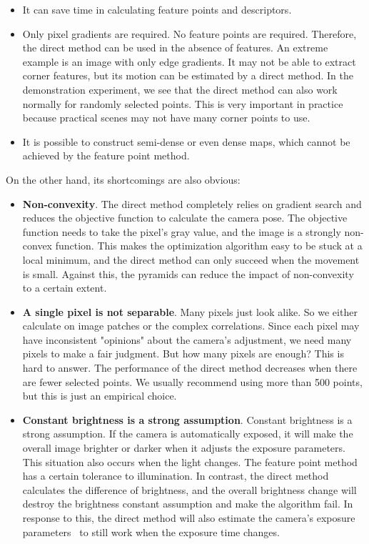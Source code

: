\begin{itemize}
	\item It can save time in calculating feature points and descriptors.
	\item Only pixel gradients are required. No feature points are required. Therefore, the direct method can be used in the absence of features. An extreme example is an image with only edge gradients. It may not be able to extract corner features, but its motion can be estimated by a direct method. In the demonstration experiment, we see that the direct method can also work normally for randomly selected points. This is very important in practice because practical scenes may not have many corner points to use.
	\item It is possible to construct semi-dense or even dense maps, which cannot be achieved by the feature point method.
\end{itemize}

On the other hand, its shortcomings are also obvious:
\begin{itemize}
	\item \textbf{Non-convexity}. The direct method completely relies on gradient search and reduces the objective function to calculate the camera pose. The objective function needs to take the pixel's gray value, and the image is a strongly non-convex function. This makes the optimization algorithm easy to be stuck at a local minimum, and the direct method can only succeed when the movement is small. Against this, the pyramids can reduce the impact of non-convexity to a certain extent.
	\item \textbf{A single pixel is not separable}. Many pixels just look alike. So we either calculate on image patches or the complex correlations. Since each pixel may have inconsistent "opinions" about the camera's adjustment, we need many pixels to make a fair judgment. But how many pixels are enough? This is hard to answer. The performance of the direct method decreases when there are fewer selected points. We usually recommend using more than 500 points, but this is just an empirical choice.
	\item \textbf{Constant brightness is a strong assumption}. Constant brightness is a strong assumption. If the camera is automatically exposed, it will make the overall image brighter or darker when it adjusts the exposure parameters. This situation also occurs when the light changes. The feature point method has a certain tolerance to illumination. In contrast, the direct method calculates the difference of brightness, and the overall brightness change will destroy the brightness constant assumption and make the algorithm fail. In response to this, the direct method will also estimate the camera's exposure parameters~\cite{Engel2016} to still work when the exposure time changes.
\end{itemize}

